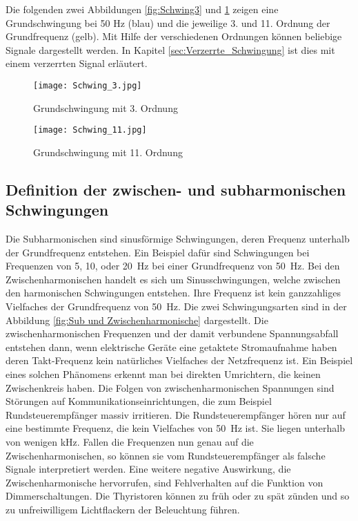 Die folgenden zwei Abbildungen \ref{fig:Schwing3} und \ref{fig:Schwing11} zeigen eine Grundschwingung bei 50 Hz (blau) und die jeweilige 3. und 11. Ordnung der Grundfrequenz (gelb). Mit Hilfe der verschiedenen Ordnungen können beliebige Signale dargestellt werden. In Kapitel \ref{sec:Verzerrte_Schwingung} ist dies mit einem verzerrten Signal erläutert. 

\begin{figure}[ht!]
	\begin{minipage}[t]{0.49\textwidth}
		\centering
		\texttt{[image: Schwing\_3.jpg]}	
		\caption{Grundschwingung mit 3. Ordnung \cite{Oberwellen}}\label{fig:Schwing3}
	\end{minipage}	
	\begin{minipage}[t]{0.49\textwidth}	
		\centering	
		\texttt{[image: Schwing\_11.jpg]}	
		\caption{Grundschwingung mit 11. Ordnung \cite{Oberwellen}}\label{fig:Schwing11}
	\end{minipage}
\end{figure}

\newpage
\subsection{Definition der zwischen- und subharmonischen Schwingungen}

Die Subharmonischen sind sinusförmige Schwingungen, deren Frequenz unterhalb der Grundfrequenz entstehen. Ein Beispiel dafür sind Schwingungen bei Frequenzen von 5, 10, oder \SI{20}{Hz} bei einer Grundfrequenz von \SI{50}{Hz}. Bei den Zwischenharmonischen handelt es sich um Sinusschwingungen, welche zwischen den harmonischen Schwingungen entstehen. Ihre Frequenz ist kein ganzzahliges Vielfaches der Grundfrequenz von \SI{50}{Hz}. Die zwei Schwingungsarten sind in der Abbildung \ref{fig:Sub und Zwischenharmonische} dargestellt. Die zwischenharmonischen Frequenzen und der damit verbundene Spannungsabfall entstehen dann, wenn elektrische Geräte eine getaktete Stromaufnahme haben deren Takt-Frequenz kein natürliches Vielfaches der Netzfrequenz ist. Ein Beispiel eines solchen Phänomens erkennt man bei direkten Umrichtern, die keinen Zwischenkreis haben. Die Folgen von zwischenharmonischen Spannungen sind Störungen auf Kommunikationseinrichtungen, die zum Beispiel Rundsteuerempfänger massiv irritieren. Die Rundsteuerempfänger hören nur auf eine bestimmte Frequenz, die kein Vielfaches von \SI{50}{Hz} ist. Sie liegen unterhalb von wenigen kHz. Fallen die Frequenzen nun genau auf die Zwischenharmonischen, so können sie vom Rundsteuerempfänger als falsche Signale interpretiert werden. Eine weitere negative Auswirkung, die Zwischenharmonische hervorrufen, sind Fehlverhalten auf die Funktion von Dimmerschaltungen. Die Thyristoren können zu früh oder zu spät zünden und so zu unfreiwilligem Lichtflackern der Beleuchtung führen. 

